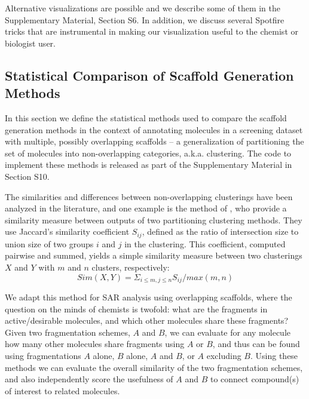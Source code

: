 \documentclass[journal=jacsat,biochem,manuscript=article]{achemso}
\begin{document}
Alternative visualizations are possible and we describe some of them
in the Supplementary Material, Section S6. In addition, we discuss several
Spotfire tricks that are instrumental in making our visualization
useful to the chemist or biologist
user. %

\subsection{Statistical Comparison of Scaffold Generation Methods}
\label{sec:statmethod}
In this section we define the statistical methods used to compare the
scaffold generation methods in the context of annotating molecules in
a screening dataset with multiple, possibly overlapping scaffolds -- a
generalization of partitioning the set of molecules into non-overlapping
categories, a.k.a. clustering. The code to implement these methods is released
as part of the Supplementary Material in Section S10.

The similarities and differences between non-overlapping clusterings
have been analyzed in the literature, and one example is the method of
\citet{Torres2009}, who provide a similarity measure between
outputs of two partitioning clustering methods. They use Jaccard's
similarity coefficient $S_{ij}$, defined as the ratio of intersection
size to union size of two groups $i$ and $j$ in the clustering.  This
coefficient, computed pairwise and summed, yields a simple similarity
measure between two clusterings $X$ and $Y$ with $m$ and $n$ clusters,
respectively:
\begin{equation}
Sim(X,Y) = \Sigma_{i \le m, j \le n}{S_{ij} / max(m,n)}
\end{equation}

We adapt this method for SAR analysis using overlapping scaffolds,
where the question on the minds of chemists is twofold: what are the
fragments in active/desirable molecules, and which other molecules
share these fragments? Given two fragmentation schemes, $A$ and $B$,
we can evaluate for any molecule how many other molecules share
fragments using $A$ or $B$, and thus can be found using fragmentations
$A$ alone, $B$ alone, $A$ and $B$, or $A$ excluding $B$.  Using these
methods we can evaluate the overall similarity of the two
fragmentation schemes, and also independently score the usefulness of
$A$ and $B$ to connect compound(s) of interest to related molecules. 
\end{document}
